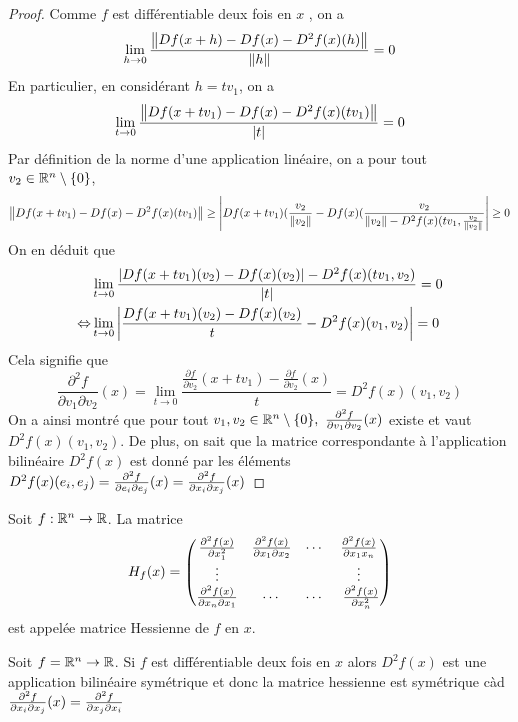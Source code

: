 \begin{proof}
    Comme $f$ est différentiable deux fois en $x$ , on a 
    \begin{align*}
        \lim_{h\to 0} \frac{\left\|  Df(x+h) -Df(x) -D^2f(x)(h) \right\|}{\left\| h \right\|} = 0
    \end{align*}
    En particulier, en considérant $h = tv_1$, on a $$\lim_{t\to 0}\frac{\left\|  Df(x+tv_1) -Df(x) -D^2f(x)(tv_1) \right\|}{\left| t \right|} = 0$$
    Par définition de la norme d'une application linéaire, on a pour tout $v_2\in\mathbb{R}^n\setminus\{0\}$,
    \begin{align*}
        \left\|  Df(x+tv_1) -Df(x) -D^2f(x)(tv_1) \right\|\ge \left| Df(x+ tv_1)(\frac{v_2}{\left\| v_2 \right\|}-Df(x)(\frac{v_2}{\left\| v_2 \right\| - D^2f(x)(tv_1,\frac{v_2}{\left\| v_2 \right\|}} \right|\ge 0
    \end{align*}
    On en déduit que 
    \begin{align*}
        &\lim_{t\to0}\frac{\left| Df(x+ tv_1)(v_2)-Df(x)(v_2) \right| -D^2f(x)(tv_1, v_2)}{\left| t \right|} = 0\\
        \Leftrightarrow &\lim_{t\to0}\left| \frac{Df(x+ tv_1)(v_2)-Df(x)(v_2)}{t}-D^2f(x)(v_1, v_2) \right| = 0\\
    \end{align*}
    Cela signifie que 
    $$\frac{\partial^2 f}{\partial v_1\partial v_2}(x)=\lim_{t\to  0}\frac{\frac{\partial f}{\partial v_2}(x+tv_1)-\frac{\partial f}{\partial v_2}(x)}{t}= D^2f(x)(v_1,v_2)$$
    On a ainsi montré que pour tout $v_1, v_2\in\mathbb{R}^n\setminus\{0\},\ \frac{\partial^2 f}{\partial v_1\partial v_2}(x)$ existe et vaut $D^2f(x)(v_1,v_2)$. De plus, on sait que la matrice correspondante à l'application bilinéaire $D^2f(x)$ est donné par les éléments $D^2f(x)(e_i,e_j) = \frac{\partial ^2f}{\partial e_i\partial e_j}(x) = \frac{\partial ^2f}{\partial x_i\partial x_j}(x)$
\end{proof}
\begin{definition}
    Soit $f:\mathbb{R}^n\to\mathbb{R}$. La matrice $$H_f(x) = \begin{pmatrix}
        \frac{\partial ^2f(x)}{\partial x_1^2} &  \frac{\partial ^2f(x)}{\partial x_1\partial x_2} & \cdots &  \frac{\partial ^2f(x)}{\partial x_1x_n}\\
        \vdots & & & \vdots\\
         \frac{\partial ^2f(x)}{\partial x_n\partial x_1} & \cdots & \cdots & \ \frac{\partial ^2f(x)}{\partial x_n^2}    \end{pmatrix}$$ est appelée matrice Hessienne de $f$ en $x$.
\end{definition}
\begin{theoreme}
    Soit $f= \mathbb{R}^n \to \mathbb{R}$. Si $f$ est différentiable deux fois en $x$ alors $D^2f(x)$ est une application bilinéaire symétrique et donc la matrice hessienne est symétrique càd $\frac{\partial ^2f}{\partial x_i\partial x_j}(x) = \frac{\partial ^2f}{\partial x_j\partial x_i}$
\end{theoreme}
